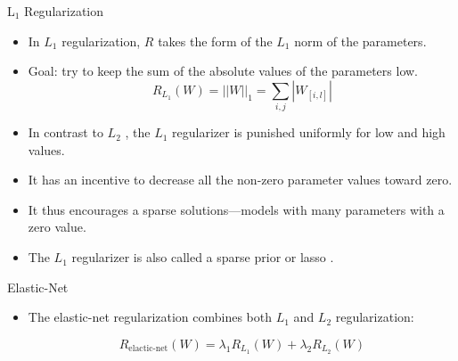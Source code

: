 \documentclass[handout]{beamer}
\begin{document}
\begin{frame}{L$_1$ Regularization}
\begin{scriptsize}
\begin{itemize}
  \item  In $L_1$ regularization, $R$ takes the form of the $L_1$ norm of the parameters.
  \item Goal: try to keep the sum of the absolute values of the parameters low.
  \begin{displaymath}
   R_{L_{1}}(W) = ||W||_{1} = \sum_{i,j} |W_{[i,l]}|
  \end{displaymath}
 \item In contrast to $L_2$ , the $L_1$ regularizer is punished uniformly for low and high values.
 \item It has an incentive to decrease all the non-zero parameter values toward zero. 
 \item It thus encourages a sparse solutions—models with many parameters with a zero value. 
 \item The $L_1$ regularizer is also called a sparse prior or lasso \cite{tibshirani1996regression}. 
  \end{itemize}
\end{scriptsize}

\end{frame}


\begin{frame}{Elastic-Net}
\begin{scriptsize}
\begin{itemize}
  \item  The elastic-net regularization \cite{zou2005regularization} combines both $L_1$ and $L_2$ regularization:
 
 \begin{displaymath}
  R_{\text{elactic-net}}(W) = \lambda_{1}R_{L_{1}}(W) + \lambda_{2}R_{L_{2}}(W)
 \end{displaymath}

  
\end{itemize}
\end{scriptsize}

\end{frame}
\end{document}
